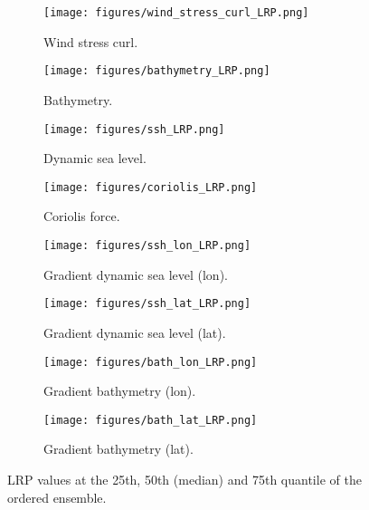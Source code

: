 \documentclass[a4paper]{article}
\begin{document}
\begin{figure}
\begin{subfigure}{0.49\textwidth}
    \centering
    \texttt{[image: figures/wind\_stress\_curl\_LRP.png]}
    \caption{Wind stress curl.}
    \label{fig:quantile_curltau}
\end{subfigure}
\hfill
\begin{subfigure}{0.49\textwidth}
    \centering
    \texttt{[image: figures/bathymetry\_LRP.png]}
    \caption{Bathymetry.}
    \label{fig:quantile_bath}
\end{subfigure}
\begin{subfigure}{0.49\textwidth}
    \centering
    \texttt{[image: figures/ssh\_LRP.png]}
    \caption{Dynamic sea level.}
    \label{fig:quantile_ssh}
\end{subfigure}
\hfill
\begin{subfigure}{0.49\textwidth}
    \centering
    \texttt{[image: figures/coriolis\_LRP.png]}
    \caption{Coriolis force.}
    \label{fig:quantile_F}
\end{subfigure}
\begin{subfigure}{0.49\textwidth}
    \centering
    \texttt{[image: figures/ssh\_lon\_LRP.png]}
    \caption{Gradient dynamic sea level (lon).}
    \label{fig:quantile_sshx}
\end{subfigure}
\hfill
\begin{subfigure}{0.49\textwidth}
    \centering
    \texttt{[image: figures/ssh\_lat\_LRP.png]}
    \caption{Gradient dynamic sea level (lat).}
    \label{fig:quantile_sshy}
\end{subfigure}

\begin{subfigure}{0.49\textwidth}
    \centering
    \texttt{[image: figures/bath\_lon\_LRP.png]}
    \caption{Gradient bathymetry (lon).}
    \label{fig:quantile_bathx}
\end{subfigure}
\hfill
\begin{subfigure}{0.49\textwidth}
    \centering
    \texttt{[image: figures/bath\_lat\_LRP.png]}
    \caption{Gradient bathymetry (lat).}
    \label{fig:quantile_bathy}
\end{subfigure}
\caption{LRP values at the 25th, 50th (median) and 75th quantile of the ordered ensemble.}\label{fig:LRP_quantile}
\end{figure}



\end{document}
